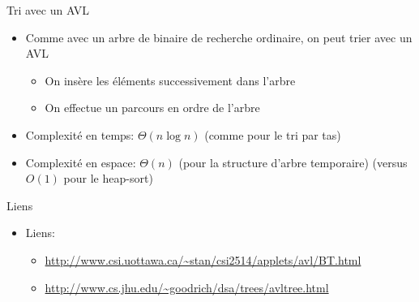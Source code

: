 \begin{frame}{Tri avec un AVL}

\begin{itemize}
\item Comme avec un arbre de binaire de recherche ordinaire, on peut trier avec un AVL
\begin{itemize}
\item On insère les éléments successivement dans l'arbre
\item On effectue un parcours en ordre de l'arbre
\end{itemize}
\item Complexité en temps: $\Theta(n\log n)$ (comme pour le tri par tas)
\item Complexité en espace: $\Theta(n)$ (pour la structure d'arbre temporaire) (versus $O(1)$ pour le heap-sort)
\end{itemize}

\end{frame}



\begin{frame}{Liens}
\begin{itemize}
\item Liens:
\begin{small}
\begin{itemize}
\item \url{http://www.csi.uottawa.ca/~stan/csi2514/applets/avl/BT.html}
\item \url{http://www.cs.jhu.edu/~goodrich/dsa/trees/avltree.html}
\end{itemize}
\end{small}
\end{itemize}
\end{frame}

